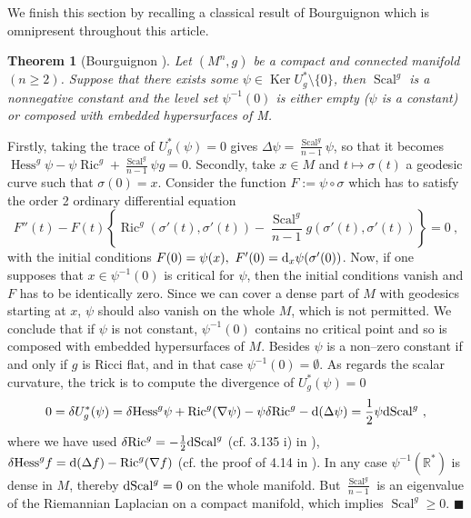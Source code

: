 \documentclass[a4paper,11pt,leqno]{amsart}
\numberwithin{equation}{section}
\theoremstyle{main}
\newtheorem{thm} {\bf  Theorem} [section]
\begin{document}
We finish this section by recalling a classical result of Bourguignon which is omnipresent throughout this article.

\begin{thm}[Bourguignon \cite{B}]\label{Bourg}
	Let $(M^n, g)$ be a compact and connected manifold ${(n\ge 2)}$. Suppose that there exists some $\psi\in {\operatorname{Ker}} U^*_g \setminus \{0\}$, then ${\operatorname{Scal}}^g$ is a nonnegative constant and the level set $\psi^{-1}(0)$ is either empty ($\psi$ is a constant) or composed with embedded hypersurfaces of M.
\end{thm}
\proof Firstly, taking the trace of $ U_g^* (\psi)=0$ gives $\Delta\psi=\frac{{\operatorname{Scal}}^g}{n-1}\psi$, so that it becomes
${\operatorname{Hess}}^g \psi -\psi{\operatorname{Ric}}^g + \frac{{\operatorname{Scal}}^g}{n-1}\psi g=0$. Secondly, take $x\in M$ and $t\mapsto \sigma(t)$ a geodesic curve such that $\sigma(0)=x$. Consider the function $F:= \psi\circ\sigma$ which has to satisfy the order 2 ordinary differential equation
$$ F''(t) -F(t)\left\{{\operatorname{Ric}}^g(\sigma'(t),\sigma'(t))- \frac{{\operatorname{Scal}}^g}{n-1}g(\sigma'(t),\sigma'(t))\right\}=  0  \ ,$$
with the initial conditions $F(0)=\psi(x), \  F'(0)={{\rm d}}_x \psi(\sigma'(0))$. Now, if one supposes that $x\in\psi^{-1}(0)$ is critical for $\psi$, then the initial conditions vanish and $F$ has to be identically zero. Since we can cover a dense part of $M$ with geodesics starting at $x$, $\psi$ should also vanish on the whole $M$, which is not permitted. We conclude that if $\psi$ is not constant,  $\psi^{-1}(0)$ contains no critical point and so is composed with embedded hypersurfaces of $M$. Besides $\psi$ is a non--zero constant if and only if $g$ is Ricci flat, and in that case $\psi^{-1}(0)=\emptyset$. As regards the scalar curvature, the trick is to compute the divergence of $U^*_g(\psi)=0$
$$0=\delta U_g^* (\psi)=\delta {\operatorname{Hess}}^g \psi +{\operatorname{Ric}}^g(\nabla \psi)- \psi \delta{\operatorname{Ric}}^g - {{\rm d}}(\Delta \psi)= \frac{1}{2}\psi {{\rm d}} {\operatorname{Scal}}^g \ ,$$
where we have used $\delta {\operatorname{Ric}}^g= -\frac{1}{2}{{\rm d}} {\operatorname{Scal}}^g$ (cf. 3.135 i) in \cite{GHL}),  $\delta {\operatorname{Hess}}^g f={{\rm d}} (\Delta f) -{\operatorname{Ric}}^g(\nabla f)$ (cf. the proof of 4.14 in \cite{GHL}). In any case  $\psi^{-1}({{\mathbb R}}^*)$ is dense in $M$, thereby ${{\rm d}} {\operatorname{Scal}}^g =0$ on the whole manifold. But $\frac{{\operatorname{Scal}}^g}{n-1}$ is an eigenvalue of the Riemannian Laplacian  on a compact manifold, which implies ${\operatorname{Scal}}^g\ge 0$. {\hfill $\blacksquare$ \medskip \\}
\end{document}
